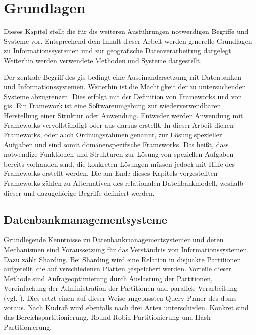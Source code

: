 \chapter{Grundlagen}
\label{Grundlagen}

Dieses Kapitel stellt die für die weiteren Ausführungen notwendigen Begriffe und Systeme vor.
Entsprechend dem Inhalt dieser Arbeit werden generelle Grundlagen zu Informationssystemen und zur geografische Datenverarbeitung dargelegt.
Weiterhin werden verwendete Methoden und Systeme dargestellt.

Der zentrale Begriff des \Gls{gis} bedingt eine Auseinandersetzung mit Datenbanken und Informationssystemen.
Weiterhin ist die Mächtigkeit der zu untersuchenden Systeme abzugrenzen.
Dies erfolgt mit der Definition von Frameworks und von \Gls{gis}.
Ein Framework ist eine Softwareumgebung zur wiederverwendbaren Herstellung einer Struktur oder Anwendung.
Entweder werden Anwendung mit Frameworks vervollständigt oder aus daraus erstellt.
In dieser Arbeit dienen Frameworks, oder auch Ordnungsrahmen genannt, zur Lösung spezieller Aufgaben und sind somit domänenspezifische Frameworks.
Das heißt, dass notwendige Funktionen und Strukturen zur Lösung von speziellen Aufgaben bereits vorhanden sind, die konkreten Lösungen müssen jedoch mit Hilfe des Frameworks erstellt werden.
Die am Ende dieses Kapitels vorgestellten Frameworks zählen zu Alternativen des relationalen Datenbankmodell, weshalb dieser und dazugehörige Begriffe definiert werden.

\section{Datenbankmanagementsysteme}

Grundlegende Kenntnisse zu Datenbankmanagementsystemen und deren Mechanismen sind Voraussetzung für das Verständnis von Informationssystemen.
Dazu zählt Sharding.
Bei Sharding wird eine Relation in disjunkte Partitionen aufgeteilt, die auf verschiedenen Platten gespeichert werden.
Vorteile dieser Methode sind Anfrageoptimierung durch Auslastung der Partitionen, Vereinfachung der Administration der Partitionen und parallele Verarbeitung (vgl. \cite[S.296]{book:kudrass}).
Dies setzt einen auf dieser Weise angepassten Query-Planer des \Gls{dbms} voraus.
Nach Kudraß wird ebenfalls nach drei Arten unterschieden.
Konkret sind das Bereichspartitionierung, Round-Robin-Partitionierung und Hash-Partitionierung.

